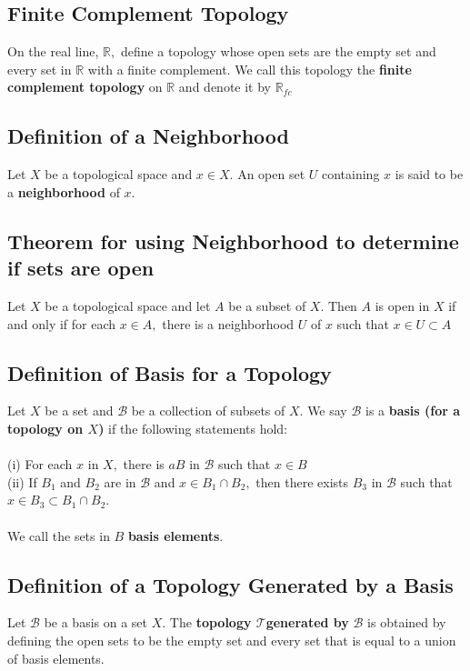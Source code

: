 \documentclass[12pt]{article}
\newcommand{\R}{\mathds{R}}
\begin{document}
	\subsection{Finite Complement Topology}
		On the real line, $\mathbb { R } ,$ define a topology whose open sets are the empty set and every set in $\mathbb { R }$ with a finite complement. We call this topology the \textbf{finite complement topology} on $ \R $ and denote it by $ \R_{fc} $
	\subsection{Definition of a Neighborhood}
		Let $X$ be a topological space and $x \in X .$ An open set $U$ containing $x$ is said to be a \textbf{neighborhood} of $x .$
	\subsection{Theorem for using Neighborhood to determine if sets are open}
	Let $X$ be a topological space and let $A$ be a subset of $X .$ Then $A$ is open in $X$ if and only if for each $x \in A ,$ there is a neighborhood $U$ of $x$ such that $x \in U \subset A$
	\subsection{Definition of Basis for a Topology}
		Let $X$ be a set and $\mathcal { B }$ be a collection of subsets of $X .$ We
		say $\mathcal { B }$ is a \textbf{basis (for a topology on $X$)} if the following statements hold:\\
			\\
			(i) For each $x$ in $X ,$ there is $a B$ in $\mathcal { B }$ such that $x \in B$\\
			(ii) If $B _ { 1 }$ and $B _ { 2 }$ are in $\mathcal { B }$ and $x \in B _ { 1 } \cap B _ { 2 } ,$ then there exists $B _ { 3 }$ in $\mathcal { B }$ such that $x \in B _ { 3 } \subset B _ { 1 } \cap B _ { 2 }$. \\
			\\
			We call the sets in $B$\textbf{ basis elements}.
	\subsection{Definition of a Topology Generated by a Basis}
		Let $\mathcal { B }$ be a basis on a set $X .$ The \textbf{topology $\mathcal { T }$generated by} $\mathcal { B }$ is obtained by defining the open sets to be the empty set and every set that is
		equal to a union of basis elements.
\end{document}
